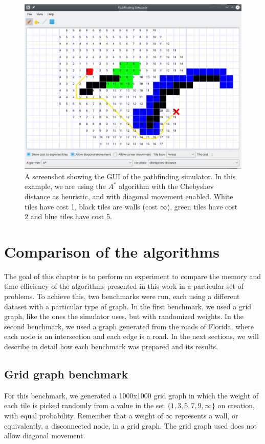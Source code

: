 \documentclass[a4paper,10pt]{report}
\begin{document}
\begin{figure}
\centering
\includegraphics[width=1\linewidth]{pathfinding-simulator}
\caption{A screenshot showing the GUI of the pathfinding simulator. In this example, we are using the $A^*$ algorithm with the Chebyshev distance as heuristic, and with diagonal movement enabled. White tiles have cost 1, black tiles are walls (cost $\infty$), green tiles have cost 2 and blue tiles have cost 5.}
\label{fig:pathfinding-simulator}
\end{figure}


\chapter{Comparison of the algorithms}
The goal of this chapter is to perform an experiment to compare the memory and time efficiency of the algorithms presented in this work in a particular set of problems. To achieve this, two benchmarks were run, each using a different dataset with a particular type of graph. In the first benchmark, we used a grid graph, like the ones the simulator uses, but with randomized weights. In the second benchmark, we used a graph generated from the roads of Florida, where each node is an intersection and each edge is a road. In the next sections, we will describe in detail how each benchmark was prepared and its results.

\section{Grid graph benchmark}
For this benchmark, we generated a 1000x1000 grid graph in which the weight of each tile is picked randomly from a value in the set $\{ 1, 3, 5, 7, 9, \infty \}$ on creation, with equal probability. Remember that a weight of $\infty$ represents a wall, or equivalently, a disconnected node, in a grid graph. The grid graph used does not allow diagonal movement.
\end{document}
